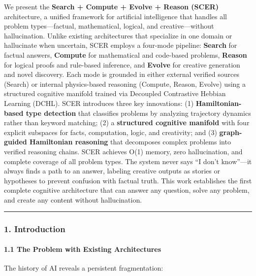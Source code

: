 \documentclass[
  11pt,
  a4paper,
]{article}
\begin{document}
We present the \textbf{Search + Compute + Evolve + Reason (SCER)}
architecture, a unified framework for artificial intelligence that
handles all problem types---factual, mathematical, logical, and
creative---without hallucination. Unlike existing architectures that
specialize in one domain or hallucinate when uncertain, SCER employs a
four-mode pipeline: \textbf{Search} for factual answers,
\textbf{Compute} for mathematical and code-based problems,
\textbf{Reason} for logical proofs and rule-based inference, and
\textbf{Evolve} for creative generation and novel discovery. Each mode
is grounded in either external verified sources (Search) or internal
physics-based reasoning (Compute, Reason, Evolve) using a structured
cognitive manifold trained via Decoupled Contrastive Hebbian Learning
(DCHL). SCER introduces three key innovations: (1)
\textbf{Hamiltonian-based type detection} that classifies problems by
analyzing trajectory dynamics rather than keyword matching; (2) a
\textbf{structured cognitive manifold} with four explicit subspaces for
facts, computation, logic, and creativity; and (3) \textbf{graph-guided
Hamiltonian reasoning} that decomposes complex problems into verified
reasoning chains. SCER achieves O(1) memory, zero hallucination, and
complete coverage of all problem types. The system never says ``I don't
know''---it always finds a path to an answer, labeling creative outputs
as stories or hypotheses to prevent confusion with factual truth. This
work establishes the first complete cognitive architecture that can
answer any question, solve any problem, and create any content without
hallucination.

\begin{center}\rule{0.5\linewidth}{0.5pt}\end{center}

\subsubsection{1. Introduction}\label{introduction-7}

\paragraph{1.1 The Problem with Existing
Architectures}\label{the-problem-with-existing-architectures}

The history of AI reveals a persistent fragmentation:
\end{document}
